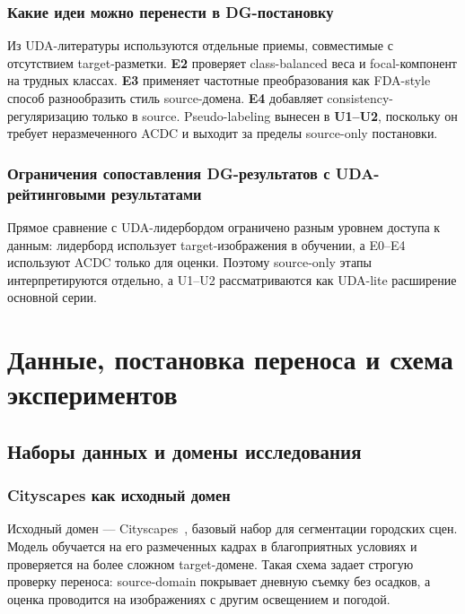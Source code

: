 \documentclass[14pt,a4paper]{extarticle}
\begin{document}
\subsubsection{Какие идеи можно перенести в DG-постановку}

Из UDA-литературы используются отдельные приемы, совместимые с отсутствием target-разметки. \textbf{E2} проверяет class-balanced веса и focal-компонент на трудных классах. \textbf{E3} применяет частотные преобразования как FDA-style способ разнообразить стиль source-домена. \textbf{E4} добавляет consistency-регуляризацию только в source. Pseudo-labeling вынесен в \textbf{U1--U2}, поскольку он требует неразмеченного ACDC и выходит за пределы source-only постановки.

\subsubsection{Ограничения сопоставления DG-результатов с UDA-рейтинговыми результатами}

Прямое сравнение с UDA-лидербордом ограничено разным уровнем доступа к данным: лидерборд использует target-изображения в обучении, а E0--E4 используют ACDC только для оценки. Поэтому source-only этапы интерпретируются отдельно, а U1--U2 рассматриваются как UDA-lite расширение основной серии.

\newpage

\section{Данные, постановка переноса и схема экспериментов}

\subsection{Наборы данных и домены исследования}

\subsubsection{Cityscapes как исходный домен}

Исходный домен --- Cityscapes~\cite{cordts2016cityscapes}, базовый набор для сегментации городских сцен. Модель обучается на его размеченных кадрах в благоприятных условиях и проверяется на более сложном target-домене. Такая схема задает строгую проверку переноса: source-domain покрывает дневную съемку без осадков, а оценка проводится на изображениях с другим освещением и погодой.
\end{document}
